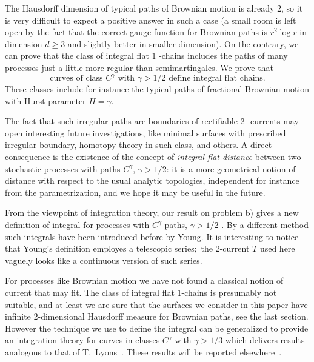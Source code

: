 \documentclass{article}
\begin{document}
The Hausdorff dimension of typical paths of Brownian motion is already $2$,
so it is very difficult to expect a positive answer in such a case (a small
room is left open by the fact that the correct gauge function for Brownian
paths is $r^{2}\log r$ in dimension $d\geq 3$ and slightly better in smaller
dimension). On the contrary, we can prove that the class of integral flat $1$%
-chains includes the paths of many processes just a little more regular than
semimartingales. We prove that 
\begin{equation*}
\text{curves of class $C^{\gamma }$ with $\gamma >1/2$ define integral flat chains.}
\end{equation*}
These classes
include for instance the typical paths of fractional Brownian motion with
Hurst parameter $H=\gamma$.

The fact that such irregular paths are boundaries of rectifiable $2$%
-currents may open interesting future investigations, like minimal surfaces
with prescribed irregular boundary, homotopy theory in such class, and
others. A direct consequence is the existence of the concept of \textit{%
integral flat distance} between two stochastic processes with paths $C^{\gamma }$, $\gamma >%
1/2$: it is a more geometrical notion
of distance  with respect to the usual analytic topologies,
independent for instance from the parametrization, and we hope it may be
useful in the future.

From the viewpoint of integration theory, our result on problem b) gives a
new definition of integral for processes with $C^{\gamma }$ paths, $\gamma >1/2$%
. By a different method such integrals have been introduced before by Young.
It is interesting to notice that Young's definition employes a telescopic
series;\ the $2$-current $T$ used here vaguely looks like a continuous
version of such series. 


For processes like Brownian motion we have not found  a classical notion
of current that may fit. The class of integral flat $1$-chains is presumably
not suitable, and at least we are sure that the surfaces we consider in
this paper have infinite $2$-dimensional Hausdorff measure for Brownian
paths, see the last section.  
However the technique we use to define the integral can be generalized 
 to provide an integration theory for
curves in classes $C^\gamma$ with $\gamma > 1/3$ which delivers
results analogous to that of T.~Lyons~\cite{Lyons}.  
These results will be reported elsewhere~\cite{GubWIP}.  
\end{document}
